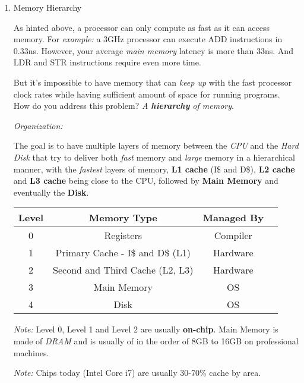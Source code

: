 \documentclass[12pt]{article}
\newenvironment{QandA}{\begin{enumerate}[label=\bfseries\arabic*.]\bfseries}
                      {\end{enumerate}}
\newenvironment{answered}{\par\quad\normalfont}{}
\begin{document}
\begin{QandA}
\item Memory Hierarchy
\begin{answered}
As hinted above, a processor can only compute as fast as it can access memory. For \textit{example:} a 3GHz processor can execute ADD instructions in 0.33ns. However, your average \textit{main memory} latency is more than 33ns. And LDR and STR instructions require even more time.

But it's impossible to have memory that can \textit{keep up} with the fast processor clock rates while having sufficient amount of space for running programs. How do you address this problem? \textit{A \textbf{hierarchy} of memory}.

\textit{Organization:}

The goal is to have multiple layers of memory between the \textit{CPU} and the \textit{Hard Disk} that try to deliver both \textit{fast} memory and \textit{large} memory in a hierarchical manner, with the \textit{fastest} layers of memory, \textbf{L1 cache} (I\$ and D\$), \textbf{L2 cache} and \textbf{L3 cache} being close to the CPU, followed by \textbf{Main Memory} and eventually the \textbf{Disk}.

\begin{center}
\begin{tabular}{ |c|c|c|c| } 
\hline
Level & Memory Type & Managed By \\
\hline
0 & Registers & Compiler \\ 
1 & Primary Cache - I\$ and D\$ (L1) & Hardware \\ 
2 & Second and Third Cache (L2, L3) & Hardware \\ 
3 & Main Memory & OS \\ 
4 & Disk & OS \\ 
\hline
\end{tabular}
\end{center}

\textit{Note:} Level 0, Level 1 and Level 2 are usually \textbf{on-chip}. Main Memory is made of \textit{DRAM} and is usually of in the order of 8GB to 16GB on professional machines. 

\textit{Note:} Chips today (Intel Core i7) are usually 30-70\% cache by area.

\end{answered}

\ 


\end{QandA}
\end{document}
